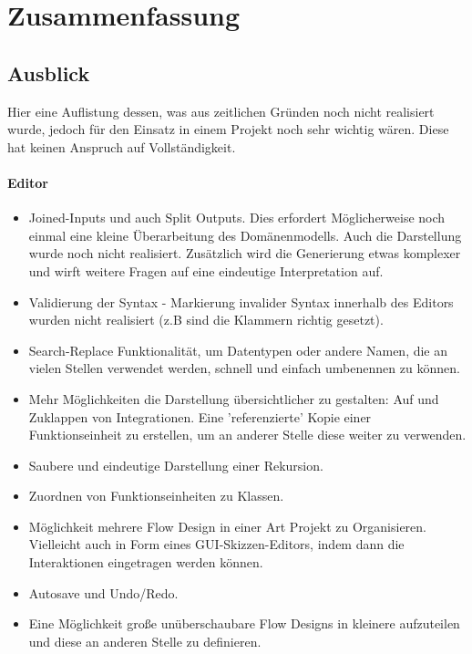 \chapter{Zusammenfassung}
\section{Ausblick}
Hier eine Auflistung dessen, was aus zeitlichen Gründen noch nicht realisiert
wurde, jedoch für den Einsatz in einem Projekt noch sehr wichtig wären.
Diese hat keinen Anspruch auf Vollständigkeit.
\subsubsection{Editor}
\begin{itemize}
	\item Joined-Inputs und auch Split Outputs. Dies erfordert Möglicherweise noch einmal
	eine kleine Überarbeitung des Domänenmodells. Auch die Darstellung wurde noch nicht realisiert. Zusätzlich wird die Generierung etwas komplexer und wirft weitere Fragen auf eine eindeutige Interpretation auf.
	
	\item Validierung der Syntax - Markierung invalider Syntax innerhalb des Editors wurden nicht realisiert (z.B sind die Klammern richtig gesetzt).
	
	\item Search-Replace Funktionalität, um Datentypen oder andere Namen, die an vielen Stellen verwendet werden, schnell und  einfach umbenennen zu können.
	
	\item Mehr Möglichkeiten die Darstellung übersichtlicher zu gestalten: Auf und
	Zuklappen von Integrationen. Eine 'referenzierte' Kopie einer
	Funktionseinheit zu erstellen, um an anderer Stelle diese weiter zu
	verwenden.
	\item Saubere und eindeutige Darstellung einer Rekursion.
	\item Zuordnen von Funktionseinheiten zu Klassen.
	\item Möglichkeit mehrere Flow Design in einer Art Projekt zu Organisieren.
	Vielleicht auch in Form eines GUI-Skizzen-Editors, indem dann die
	Interaktionen eingetragen werden können.
	\item Autosave und Undo/Redo.
	\item Eine Möglichkeit große unüberschaubare Flow Designs in kleinere aufzuteilen und diese an anderen Stelle zu definieren.
	
\end{itemize}


